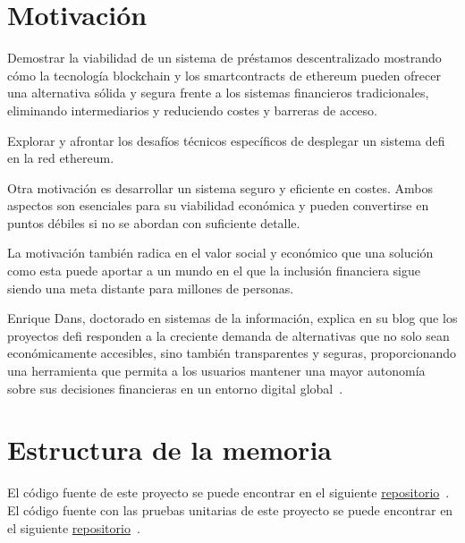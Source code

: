 \section{Motivación}
\label{s:motivacion}

Demostrar la viabilidad de un sistema de préstamos descentralizado mostrando 
cómo la 
tecnología \gls{blockchain} y los \glspl{smartcontract} de \gls{ethereum} 
pueden ofrecer una alternativa 
sólida y segura frente a los sistemas financieros tradicionales, 
eliminando intermediarios y 
reduciendo  costes y barreras de acceso.

Explorar y afrontar los desafíos técnicos específicos de desplegar un sistema 
\gls{defi} 
en la red \gls{ethereum}.

Otra motivación es desarrollar un sistema seguro y eficiente en costes.
Ambos aspectos son esenciales para su viabilidad económica y pueden convertirse
en puntos débiles si no se abordan con suficiente detalle.

La motivación también radica en el valor social y económico que una solución 
como esta puede aportar a un mundo en el que la inclusión financiera sigue siendo una meta distante
para millones de personas. 


Enrique Dans, doctorado en sistemas de la información, explica en su blog que los
proyectos \gls{defi} responden a la creciente demanda de alternativas que no 
solo sean económicamente 
accesibles, sino también transparentes y seguras, proporcionando una herramienta 
que permita a 
los usuarios mantener una mayor autonomía sobre sus decisiones financieras en 
un entorno digital 
global~\cite{[3]}.

\section{Estructura de la memoria}

El código fuente de este proyecto se puede encontrar en el siguiente 
\href{https://github.com/AkilinoGit/akilinogit.github.io}{repositorio}~\cite{[25]}.
El código fuente con las pruebas unitarias de este proyecto se puede encontrar en el siguiente
\href{https://github.com/AkilinoGit/prestamosFactoryMochaTest.git}{repositorio}~\cite{[34]}.

